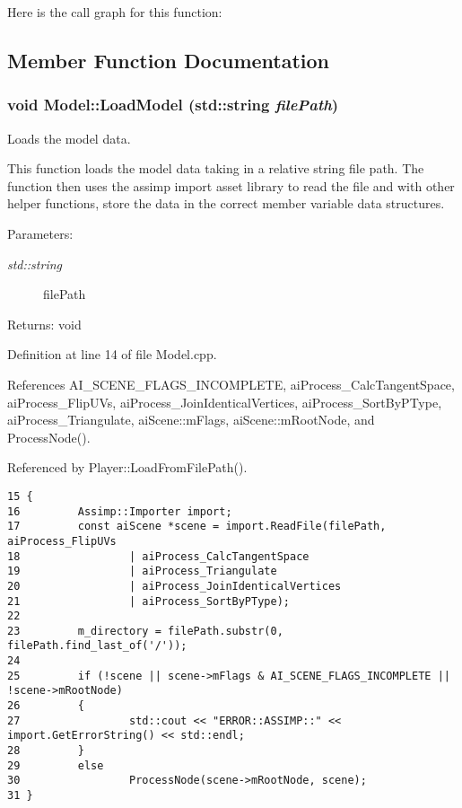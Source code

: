 Here is the call graph for this function:

\subsection{Member Function Documentation}
\hypertarget{class_model_d7e2859170e157f9c6393b16e54c3fd8}{
\subsubsection[LoadModel]{\setlength{\rightskip}{0pt plus 5cm}void Model::LoadModel (std::string {\em filePath})}}
\label{class_model_d7e2859170e157f9c6393b16e54c3fd8}


Loads the model data. 

This function loads the model data taking in a relative string file path. The function then uses the assimp import asset library to read the file and with other helper functions, store the data in the correct member variable data structures.

\begin{Desc}
\item[Parameters:]
\begin{description}
\item[{\em std::string}]filePath \end{description}
\end{Desc}
\begin{Desc}
\item[Returns:]void \end{Desc}


Definition at line 14 of file Model.cpp.

References AI\_\-SCENE\_\-FLAGS\_\-INCOMPLETE, aiProcess\_\-CalcTangentSpace, aiProcess\_\-FlipUVs, aiProcess\_\-JoinIdenticalVertices, aiProcess\_\-SortByPType, aiProcess\_\-Triangulate, aiScene::mFlags, aiScene::mRootNode, and ProcessNode().

Referenced by Player::LoadFromFilePath().

\begin{Code}\begin{verbatim}15 {
16         Assimp::Importer import;
17         const aiScene *scene = import.ReadFile(filePath, aiProcess_FlipUVs 
18                 | aiProcess_CalcTangentSpace
19                 | aiProcess_Triangulate 
20                 | aiProcess_JoinIdenticalVertices 
21                 | aiProcess_SortByPType);
22 
23         m_directory = filePath.substr(0, filePath.find_last_of('/'));
24 
25         if (!scene || scene->mFlags & AI_SCENE_FLAGS_INCOMPLETE || !scene->mRootNode)
26         {
27                 std::cout << "ERROR::ASSIMP::" << import.GetErrorString() << std::endl;
28         }
29         else
30                 ProcessNode(scene->mRootNode, scene);
31 }
\end{verbatim}
\end{Code}




